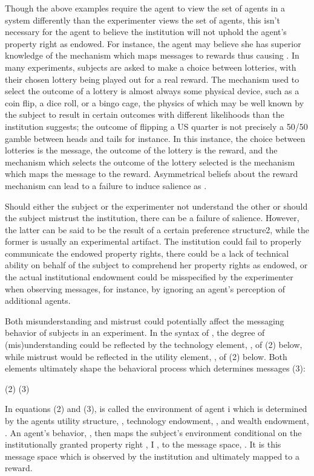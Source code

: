 \documentclass[../main.tex]{subfiles}
\begin{document}
Though the above examples require the agent to view the set of agents in a system differently than the experimenter views the set of agents, this isn't necessary for the agent to believe the institution will not uphold the agent's property right as endowed.
For instance, the agent may believe she has superior knowledge of the mechanism which maps messages to rewards thus causing .
In many experiments, subjects are asked to make a choice between lotteries, with their chosen lottery being played out for a real reward.
The mechanism used to select the outcome of a lottery is almost always some physical device, such as a coin flip, a dice roll, or a bingo cage, the physics of which may be well known by the subject to result in certain outcomes with different likelihoods than the institution suggests; the outcome of flipping a US quarter is not precisely a 50/50 gamble between heads and tails for instance.
In this instance, the choice between lotteries is the message, the outcome of the lottery is the reward, and the mechanism which selects the outcome of the lottery selected is the mechanism which maps the message to the reward.
Asymmetrical beliefs about the reward mechanism can lead to a failure to induce salience as .

Should either the subject or the experimenter not understand the other or should the subject mistrust  the institution, there can be a failure of salience.
However, the latter can be said to be the result of a certain preference structure2, while the former is usually an experimental artifact.
The institution could fail to properly communicate the endowed property rights, there could be a lack of technical ability on behalf of the subject to comprehend her property rights as endowed, or the actual institutional endowment could be misspecified by the experimenter when observing messages, for instance, by ignoring an agent's perception of additional agents.


Both misunderstanding and mistrust could potentially affect the  messaging behavior of subjects in an experiment.
In the syntax of \textcite{Smith1982}⁠, the degree of (mis)understanding could be reflected by the technology element, , of (2) below, while mistrust would be reflected in the utility element, , of (2) below.
Both elements ultimately shape the behavioral process which determines messages (3):

(2)	
(3)	

In equations (2) and (3),  is called the environment of agent i which is determined by the agents utility structure, , technology endowment, , and wealth endowment, .
An agent's behavior, , then maps the subject's environment conditional on the institutionally granted property right , I , to the message space, .
It is this message space which is observed by the institution and ultimately mapped to a reward.
\end{document}
